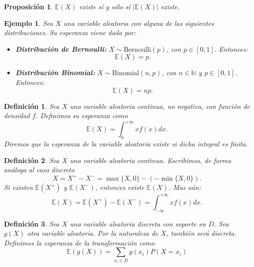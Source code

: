 \documentclass{report}
\newtheorem{prop}{Proposición}[section]
\newtheorem{dfn}{Definición}[section]
\newtheorem{ej}{Ejemplo}[section]
\begin{document}
\begin{prop}
$\mathbb{E}(X)$ existe sí y sólo sí $|\mathbb{E}(X)|$ existe.
\end{prop}
 
\begin{ej}
Sea \( X \) una variable aleatoria con alguna de las siguientes distribuciones. Su esperanza viene dada por:

\begin{itemize}
    \item \textbf{Distribución de Bernoulli:} \( X \sim \mathrm{Bernoulli}(p) \), con \( p \in [0,1] \). Entonces:
    \[
    \mathbb{E}(X) = p.
    \]

    \item \textbf{Distribución Binomial:} \( X \sim \mathrm{Binomial}(n, p) \), con \( n \in \mathbb{N} \) y \( p \in [0,1] \). Entonces:
    \[
    \mathbb{E}(X) = np.
    \]
\end{itemize}
\end{ej}


\begin{dfn}
    Sea $X$ una variable aleatoria continua, no negativa, con función de densidad $f$. Definimos su esperanza como
    \begin{equation*}
\mathbb{E}(X) = \int_{0}^{+\infty} x f(x) dx.
    \end{equation*}
    Diremos que la esperanza de la variable aleatoria existe si dicha integral es finita.
\end{dfn}

\begin{dfn}
Sea $X$ una variable aleatoria continua. Escribimos, de forma análoga al caso discreto
\begin{equation*}
    X=X^+ - X^- = \max\{X,0\} - (-\min\{X,0\}).
\end{equation*}
Si existen $\mathbb{E}(X^+)$ y $\mathbb{E}(X^-)$, entonces existe $\mathbb{E}(X)$. Mas aún:
\begin{equation*}
    \mathbb{E}(X) = \mathbb{E}(X^+) - \mathbb{E}(X^-) = \int_{-\infty}^{+\infty} x f(x) dx.
\end{equation*}
\end{dfn}

\begin{dfn}
Sea $X$ una variable aleatoria discreta con soporte en $D$. Sea $g(X)$ otra variable aleatoria. Por la naturaleza de $X$, también 
será discreta. Definimos la esperanza de la transformación como
\begin{equation*}
\mathbb{E}(g(X)) = \sum_{x_i\in D} g(x_i)P(X=x_i)
\end{equation*}
\end{dfn}
\end{document}
